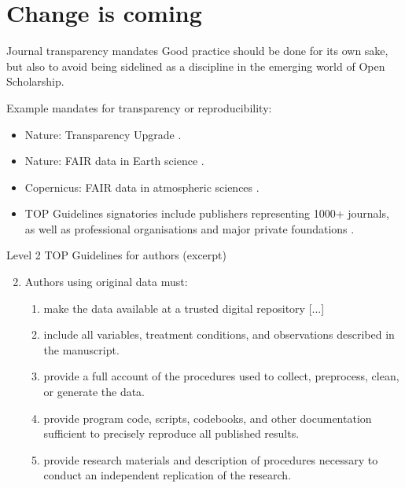 \documentclass[aspectratio=169, 11pt]{beamer} %
\begin{document}
\section{Change is coming}

\begin{frame}{Journal transparency mandates}
  Good practice should be done for its own sake, but also to avoid being sidelined as a discipline in the emerging world of Open Scholarship. \par
  Example mandates for transparency or reproducibility:
    \begin{itemize}[label=\textbullet]
        \item Nature: Transparency Upgrade \cite{Nature2017-lq}.
        \item Nature: FAIR data in Earth science \cite{Nature2019-ng}.
        \item Copernicus: FAIR data in atmospheric sciences \cite{Van_Edig2018-bu}.
        \item TOP Guidelines signatories include publishers representing 1000+ journals, as well as professional organisations and major private foundations  \cite{Cos2019-mr}.
    \end{itemize}
\end{frame}


\begin{frame}{Level 2 TOP Guidelines for authors (excerpt)}
  
    \begin{enumerate}[label=\arabic*.]
        \setcounter{enumi}{1}
        
        \item Authors using original data must:
        \begin{enumerate}[label=\alph*.]
            \item make the data available at a trusted digital repository [...]
            \item include all variables, treatment conditions, and observations described in the manuscript.
            \item provide a full account of the procedures used to collect, preprocess, clean, or generate the data.
            \item provide program code, scripts, codebooks, and other documentation sufficient to precisely reproduce all published results.
            \item provide research materials and description of procedures necessary to conduct an independent replication of the research.
        \end{enumerate}
    \end{enumerate}
    \cite{Osf2014-pf}
\end{frame}
\end{document}
